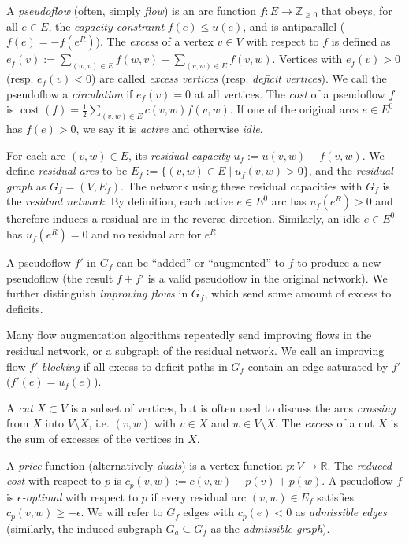 \documentclass[11pt]{article}
\theoremstyle{plain}
\def\cost{\operatorname{cost}}
\begin{document}
A \emph{pseudoflow} (often, simply \emph{flow}) is an 
arc function $f: E \to \mathbb{Z}_{\geq 0}$ that obeys, for all $e \in E$,
the \emph{capacity constraint} $f(e) \leq u(e)$,
and is antiparallel ($f(e) = -f(e^R)$).
The \emph{excess} of a vertex $v \in V$ with respect to $f$ is defined as 
$e_f(v) := \sum_{(w, v) \in E}{f(w, v)} - \sum_{(v, w) \in E}{f(v, w)}$.
Vertices with $e_f(v) > 0$ (resp. $e_f(v) < 0$) are called \emph{excess vertices} 
(resp. \emph{deficit vertices}).
We call the pseudoflow a \emph{circulation} if $e_f(v) = 0$ at all vertices.
The \emph{cost} of a pseudoflow $f$ is 
$\cost(f) = \frac{1}{2} \sum_{(v, w) \in E}{c(v, w) f(v, w)}$.
If one of the original arcs $e \in E^0$ has $f(e) > 0$, 
we say it is \emph{active} and otherwise \emph{idle}.

For each arc $(v, w) \in E$, its \emph{residual capacity} $u_f := u(v, w) - f(v, w)$.
We define \emph{residual arcs} to be $E_f := \{(v, w) \in E \mid u_f(v, w) > 0\}$,
and the \emph{residual graph} as $G_f = (V, E_f)$.
The network using these residual capacities with $G_f$ is the \emph{residual network}.
By definition, each active $e \in E^0$ arc has $u_f(e^R) > 0$ and 
therefore induces a residual arc in the reverse direction.
Similarly, an idle $e \in E^0$ has $u_f(e^R) = 0$ and no residual arc for $e^R$.

A pseudoflow $f'$ in $G_f$ can be ``added'' or ``augmented'' to $f$ to produce a new pseudoflow
(the result $f + f'$ is a valid pseudoflow in the original network).
We further distinguish \emph{improving flows} in $G_f$, 
which send some amount of excess to deficits.

Many flow augmentation algorithms repeatedly send improving flows
in the residual network, or a subgraph of the residual network.
We call an improving flow $f'$ \emph{blocking} if all excess-to-deficit paths 
in $G_f$ contain an edge saturated by $f'$ ($f'(e) = u_f(e)$).

A \emph{cut} $X \subset V$ is a subset of vertices,
but is often used to discuss the arcs \emph{crossing} from $X$ into $V \setminus X$,
i.e. $(v, w)$ with $v \in X$ and $w \in V \setminus X$.
The \emph{excess} of a cut $X$ is the sum of excesses of the vertices in $X$.

A \emph{price} function (alternatively \emph{duals}) is a vertex function
$p: V \to \mathbb{R}$.
The \emph{reduced cost} with respect to $p$ is $c_p(v, w) := c(v, w) - p(v) + p(w)$.
A pseudoflow $f$ is \emph{$\epsilon$-optimal} with respect to $p$ if
every residual arc $(v, w) \in E_f$ satisfies $c_p(v, w) \geq -\epsilon$.
We will refer to $G_f$ edges with $c_p(e) < 0$ as \emph{admissible edges}
(similarly, the induced subgraph $G_a \subseteq G_f$ as the \emph{admissible graph}).
\end{document}
